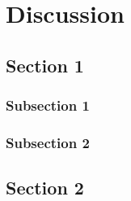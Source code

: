 
\chapter{Discussion} %

\label{Discussion} %


\section{Section 1}

\subsection{Subsection 1}



\subsection{Subsection 2}


\section{Section 2}

